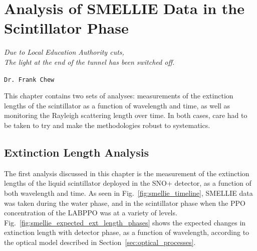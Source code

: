\chapter{Analysis of SMELLIE Data in the Scintillator Phase}\label{chap:smellie_analysis}
\epigraph{\textit{Due to Local Education Authority cuts,\\The light at the end of the tunnel has been switched off.}}{\texttt{Dr. Frank Chew}}

This chapter contains two sets of analyses: measurements of the extinction lengths of the scintillator as a function of wavelength and time, as well as monitoring the Rayleigh scattering length over time. In both cases, care had to be taken to try and make the methodologies robust to systematics.

\section{Extinction Length Analysis}\label{sec:ext_length_analysis}
The first analysis discussed in this chapter is the measurement of the extinction lengths of the liquid scintillator deployed in the SNO+ detector, as a function of both wavelength and time. As seen in Fig.~\ref{fig:smellie_timeline}, SMELLIE data was taken during the water phase, and in the scintillator phase when the PPO concentration of the LABPPO was at a variety of levels. Fig.~\ref{fig:smellie_expected_ext_length_phases} shows the expected changes in extinction length with detector phase, as a function of wavelength, according to the optical model described in Section~\ref{sec:optical_processes}.

